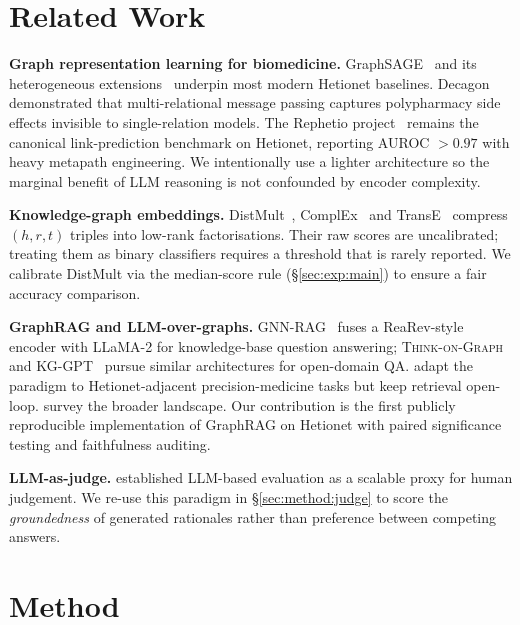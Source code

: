 \documentclass{article}
\begin{document}
\section{Related Work}
\label{sec:related}

\textbf{Graph representation learning for biomedicine.}
GraphSAGE~\citep{hamilton2017graphsage} and its heterogeneous extensions~\citep{hu2020hgt,fey2019pyg} underpin most modern Hetionet baselines. Decagon~\citep{zitnik2018decagon} demonstrated that multi-relational message passing captures polypharmacy side effects invisible to single-relation models. The Rephetio project~\citep{himmelstein2017} remains the canonical link-prediction benchmark on Hetionet, reporting AUROC $>0.97$ with heavy metapath engineering. We intentionally use a lighter architecture so the marginal benefit of LLM reasoning is not confounded by encoder complexity.

\textbf{Knowledge-graph embeddings.}
DistMult~\citep{yang2015distmult}, ComplEx~\citep{trouillon2016complex} and TransE~\citep{bordes2013transe} compress $(h,r,t)$ triples into low-rank factorisations. Their raw scores are uncalibrated; treating them as binary classifiers requires a threshold that is rarely reported. We calibrate DistMult via the median-score rule (\S\ref{sec:exp:main}) to ensure a fair accuracy comparison.

\textbf{GraphRAG and LLM-over-graphs.}
GNN-RAG~\citep{mavromatis2024gnnrag} fuses a ReaRev-style encoder with LLaMA-2 for knowledge-base question answering; \textsc{Think-on-Graph}~\citep{sun2024tog} and KG-GPT~\citep{kim2023kggpt} pursue similar architectures for open-domain QA. \citet{hays2026raggnn} adapt the paradigm to Hetionet-adjacent precision-medicine tasks but keep retrieval open-loop. \citet{gao2024ragsurvey} survey the broader landscape. Our contribution is the first publicly reproducible implementation of GraphRAG on Hetionet with paired significance testing and faithfulness auditing.

\textbf{LLM-as-judge.}
\citet{zheng2023judge} established LLM-based evaluation as a scalable proxy for human judgement. We re-use this paradigm in \S\ref{sec:method:judge} to score the \emph{groundedness} of generated rationales rather than preference between competing answers.

\section{Method}
\label{sec:method}
\end{document}

